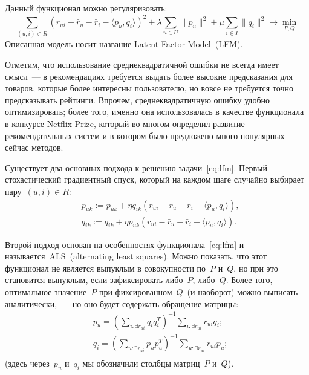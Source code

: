 \documentclass[12pt,fleqn]{article}
\begin{document}
Данный функционал можно регуляризовать:
\begin{equation}
\label{eq:lfmReg}
    \sum_{(u, i) \in R}
        \left(
            r_{ui}
            - \bar r_u
            - \bar r_i
            - \langle p_u, q_i \rangle
        \right)^2
    +
    \lambda
    \sum_{u \in U}
        \|p_u\|^2
    +
    \mu
    \sum_{i \in I}
        \|q_i\|^2
    \to
    \min_{P, Q}
\end{equation}
Описанная модель носит название Latent Factor Model~(LFM).

Отметим, что использование среднеквадратичной ошибки не всегда имеет смысл~---
в рекомендациях требуется выдать более высокие предсказания для товаров, которые более интересны пользователю,
но вовсе не требуется точно предсказывать рейтинги.
Впрочем, среднеквадратичную ошибку удобно оптимизировать;
более того, именно она использовалась в качестве функционала в конкурсе Netflix Prize,
который во многом определил развитие рекомендательных систем и в котором было предложено много
популярных сейчас методов.

Существует два основных подхода к решению задачи~\eqref{eq:lfm}.
Первый~--- стохастический градиентный спуск, который на каждом шаге случайно выбирает пару~$(u, i) \in R$:
\begin{align*}
    &p_{uk}
    :=
    p_{uk}
    +
    \eta
    q_{ik}
    \left(
        r_{ui}
        - \bar r_u
        - \bar r_i
        - \langle p_u, q_i \rangle
    \right),\\
    &q_{ik}
    :=
    q_{ik}
    +
    \eta
    p_{uk}
    \left(
        r_{ui}
        - \bar r_u
        - \bar r_i
        - \langle p_u, q_i \rangle
    \right).
\end{align*}

Второй подход основан на особенностях функционала~\eqref{eq:lfm} и называется~ALS~(alternating least squares).
Можно показать, что этот функционал не является выпуклым в совокупности по~$P$ и~$Q$,
но при это становится выпуклым, если зафиксировать либо~$P$, либо~$Q$.
Более того, оптимальное значение~$P$ при фиксированном~$Q$~(и наоборот) можно выписать аналитически,~---
но оно будет содержать обращение матрицы:
\begin{align*}
    &p_u
    =
    \left(
        \sum_{i: \exists r_{ui}}
            q_i q_i^T
    \right)^{-1}
    \sum_{i: \exists r_{ui}}
        r_{ui} q_i;\\
    &q_i
    =
    \left(
        \sum_{u: \exists r_{ui}}
            p_u p_u^T
    \right)^{-1}
    \sum_{u: \exists r_{ui}}
        r_{ui} p_u;\\
\end{align*}
(здесь через~$p_u$ и~$q_i$ мы обозначили столбцы матриц~$P$ и~$Q$).
\end{document}
